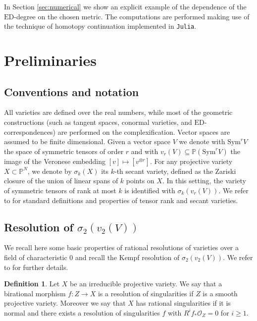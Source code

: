 \documentclass[11pt]{article}
\numberwithin{equation}{section}
\numberwithin{figure}{section}
\theoremstyle{plain}
\theoremstyle{definition}
\newtheorem{defn}[thm]{Definition}
\theoremstyle{remark}
\newcommand{\ot}{\otimes}
\newcommand{\su}{\subseteq}
\renewcommand{\P}{\mathbb{P}}
\newcommand{\ED}{\mathrm{ED}}
\begin{document}
In Section \ref{sec:numerical} we show an explicit example of the dependence of the $\ED$-degree on the chosen metric. The computations are performed making use of the technique of homotopy continuation implemented in \texttt{Julia}.

\section{Preliminaries}
\subsection{Conventions and notation}\label{sec:preliminaries}
All varieties are defined over the real numbers, while most of the geometric constructions (such as tangent spaces, conormal varieties, and $\ED$-correspondences) are performed on the complexification. Vector spaces are assumed to be finite dimensional. Given a vector space $V$ we denote with $\mathrm{Sym}^r V$ the space of symmetric tensors of order $r$ and with 
$v_r \left( V \right) \su \P\left( \mathrm{Sym}^r V \right)$ the image of the Veronese embedding $\left[ v \right] \mapsto \left[ v^{\ot r} \right]$. For any projective variety $X \subset \mathbb{P}^N$, we denote by $\sigma_k \left( X \right)$ its $k$-th secant variety, defined as the Zariski closure of the union of linear spans of $k$ points on $X$.
In this setting, the variety of symmetric tensors of rank at most $k$ is identified with $\sigma_k \left( v_r \left( V \right) \right)$. We refer to \cite{Lan12} for standard definitions and properties of tensor rank and secant varieties.

\subsection{Resolution of $\sigma_2\left( v_2 \left( V \right) \right)$}
\label{section:resolution}

We recall here some basic properties of rational resolutions of varieties over a field of characteristic 0 and recall the Kempf resolution of $\sigma_2\left( v_2 \left( V \right) \right)$. We refer to \cite{Wey} for further details.

\begin{defn}
Let $X$ be an irreducible projective variety. We say that a birational morphism $f:Z\to X$ is a resolution of singularities if $Z$ is a smooth projective variety. Moreover we say that $X$ has rational singularities if it is normal and there exists a resolution of singularities $f$ with $R^{i}f_{\ast}\mathcal{O}_{Z}=0$ for $i\ge1$.
\end{defn}
\end{document}
